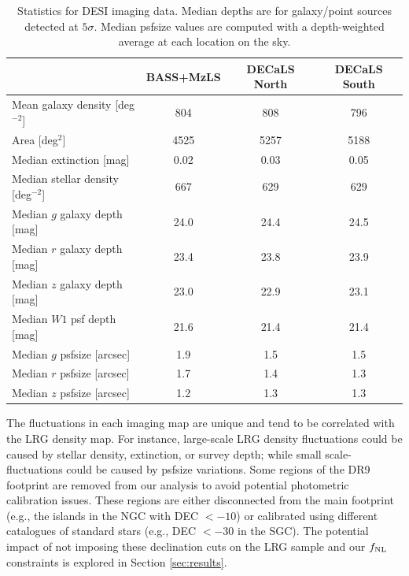 \begin{table}
\caption{Statistics for DESI imaging data. Median depths are for galaxy/point sources detected at $5\sigma$. Median psfsize values are computed with a depth-weighted average at each location on the sky.}
\begin{center}
\begin{tabular}{lccc}
\hline
\hline
    & BASS+MzLS & DECaLS North &DECaLS South \\
\hline
\hline
Mean galaxy density [deg$^{-2}$]     & 804  & 808  & 796 \\
Area [deg$^2$]                       & 4525 & 5257 & 5188 \\
Median extinction [mag]              & 0.02 & 0.03 & 0.05\\
Median stellar density [deg$^{-2}$]  & 667  & 629  & 629\\
Median $g$ galaxy depth [mag]        & 24.0 & 24.4 & 24.5 \\
Median $r$ galaxy depth [mag]        & 23.4 & 23.8 & 23.9\\
Median $z$ galaxy depth [mag]        & 23.0 & 22.9 & 23.1\\
Median $W1$ psf depth [mag]          & 21.6 & 21.4 & 21.4\\
Median $g$ psfsize [arcsec]          & 1.9  & 1.5  & 1.5\\
Median $r$ psfsize [arcsec]          & 1.7  & 1.4  & 1.3\\
Median $z$ psfsize [arcsec]          & 1.2  & 1.3  & 1.3\\
\hline
\end{tabular}
\end{center}
\label{tab:imaging}
\end{table} 

The fluctuations in each imaging map are unique and tend to be correlated with the LRG density map. For instance, large-scale LRG density fluctuations could be caused by stellar density, extinction, or survey depth; while small scale-fluctuations could be caused by psfsize variations. Some regions of the DR9 footprint are removed from our analysis to avoid potential photometric calibration issues. These regions are either disconnected from the main footprint (e.g., the islands in the NGC with DEC $<-10$) or calibrated using different catalogues of standard stars (e.g., DEC $<-30$ in the SGC). The potential impact of not imposing these declination cuts on the LRG sample and our $f_{\rm NL}$ constraints is explored in Section \ref{sec:results}. 

